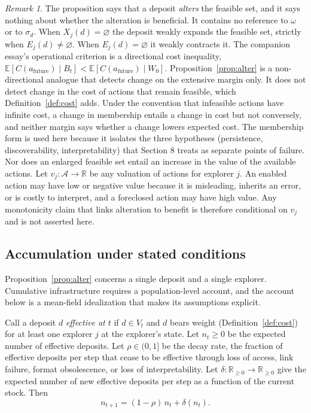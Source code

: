 \documentclass[11pt]{article}
\theoremstyle{definition}
\theoremstyle{remark}
\newtheorem{remark}[proposition]{Remark}
\begin{document}
\begin{remark}
The proposition says that a deposit \emph{alters} the feasible set, and it says nothing about whether the alteration is beneficial. It contains no reference to $\omega$ or to $\sigma_d$. When $X_j(d)=\varnothing$ the deposit weakly expands the feasible set, strictly when $E_j(d)\neq\varnothing$. When $E_j(d)=\varnothing$ it weakly contracts it. The companion essay's operational criterion is a directional cost inequality, $\mathbb{E}[C(a_{\mathrm{future}})\mid B_t]<\mathbb{E}[C(a_{\mathrm{future}})\mid W_0]$. Proposition~\ref{prop:alter} is a non-directional analogue that detects change on the extensive margin only. It does not detect change in the cost of actions that remain feasible, which Definition~\ref{def:cost} adds. Under the convention that infeasible actions have infinite cost, a change in membership entails a change in cost but not conversely, and neither margin says whether a change lowers expected cost. The membership form is used here because it isolates the three hypotheses (persistence, discoverability, interpretability) that Section 8 treats as separate points of failure. Nor does an enlarged feasible set entail an increase in the value of the available actions. Let $v_j:\mathcal{A}\to\mathbb{R}$ be any valuation of actions for explorer $j$. An enabled action may have low or negative value because it is misleading, inherits an error, or is costly to interpret, and a foreclosed action may have high value. Any monotonicity claim that links alteration to benefit is therefore conditional on $v_j$ and is not asserted here.
\end{remark}

\subsection{Accumulation under stated conditions}

Proposition~\ref{prop:alter} concerns a single deposit and a single explorer. Cumulative infrastructure requires a population-level account, and the account below is a mean-field idealization that makes its assumptions explicit.

Call a deposit $d$ \emph{effective at $t$} if $d\in V_t$ and $d$ bears weight (Definition~\ref{def:cost}) for at least one explorer $j$ at the explorer's state. Let $n_t\ge 0$ be the expected number of effective deposits. Let $\rho\in(0,1]$ be the decay rate, the fraction of effective deposits per step that cease to be effective through loss of access, link failure, format obsolescence, or loss of interpretability. Let $\delta:\mathbb{R}_{\ge0}\to\mathbb{R}_{\ge0}$ give the expected number of new effective deposits per step as a function of the current stock. Then
\begin{equation}\label{eq:stock}
n_{t+1}=(1-\rho)\,n_t+\delta(n_t).
\end{equation}
\end{document}
